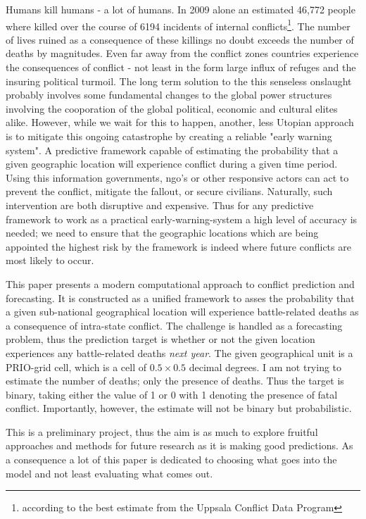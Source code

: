 \documentclass[a4paper]{article}
\begin{document}
Humans kill humans - a lot of humans. In 2009 alone an estimated 46,772 people where killed over the course of 6194 incidents of internal conflicts\footnote{according to the best estimate from the Uppsala Conflict Data Program}. The number of lives ruined as a consequence of these killings no doubt exceeds the number of deaths by magnitudes. Even far away from the conflict zones countries experience the consequences of conflict - not least in the form large influx of refuges and the insuring political turmoil. The long term solution to the this senseless onslaught probably involves some fundamental changes to the global power structures involving the cooporation of the global political, economic and cultural elites alike. However, while we wait for this to happen, another, less Utopian approach is to mitigate this ongoing catastrophe by creating a reliable "early warning system". A predictive framework capable of estimating the probability that a given geographic location will experience conflict during a given time period. Using this information governments, ngo's or other responsive actors can act to prevent the conflict, mitigate the fallout, or secure civilians. Naturally, such intervention are both disruptive and expensive. Thus for any predictive framework to work as a practical early-warning-system a high level of accuracy is needed; we need to ensure that the geographic locations which are being appointed the highest risk by the framework is indeed where future conflicts are most likely to occur.\par

This paper presents a modern computational approach to conflict prediction and forecasting. It is constructed as a unified framework to asses the probability that a given sub-national geographical location will experience battle-related deaths as a consequence of intra-state conflict. The challenge is handled as a forecasting problem, thus the prediction target is whether or not the given location experiences any battle-related deaths \emph{next year}. The given geographical unit is a PRIO-grid cell, which is a cell of $0.5\times0.5$ decimal degrees. I am not trying to estimate the number of deaths; only the presence of deaths. Thus the target is binary, taking either the value of 1 or 0 with 1 denoting the presence of fatal conflict. Importantly, however, the estimate will not be binary but probabilistic.\par

This is a preliminary project, thus the aim is as much to explore fruitful approaches and methods for future research as it is making good predictions. As a consequence a lot of this paper is dedicated to choosing what goes into the model and not least evaluating what comes out.\par
\end{document}
